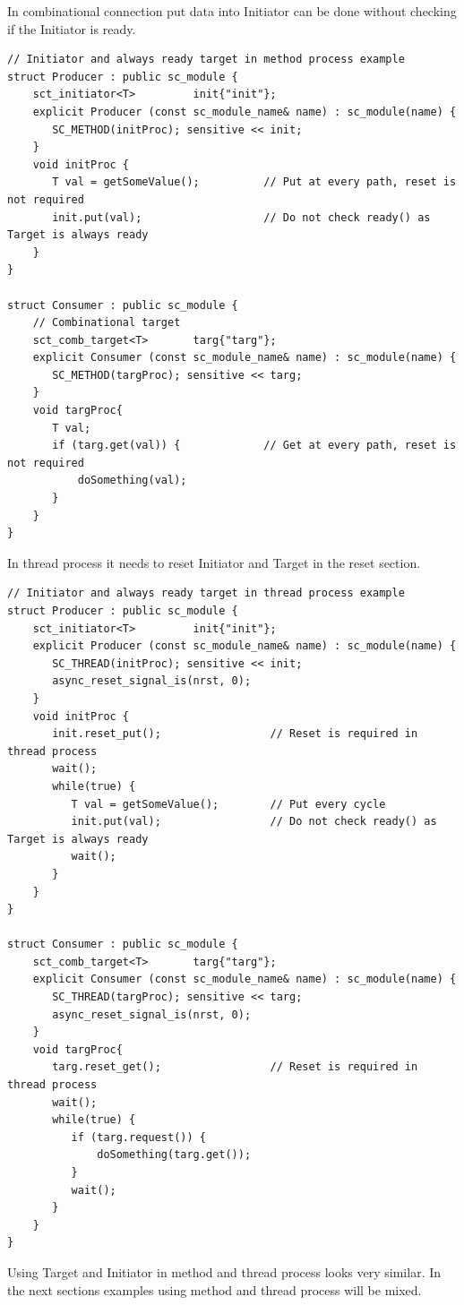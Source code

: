 In combinational connection put data into Initiator can be done without checking if the Initiator is ready.

\begin{lstlisting}[style=mycpp]
// Initiator and always ready target in method process example
struct Producer : public sc_module {
    sct_initiator<T>         init{"init"};
    explicit Producer (const sc_module_name& name) : sc_module(name) {
       SC_METHOD(initProc); sensitive << init;
    } 
    void initProc {
       T val = getSomeValue();          // Put at every path, reset is not required 
       init.put(val);                   // Do not check ready() as Target is always ready
    }						   
}

struct Consumer : public sc_module {
    // Combinational target
    sct_comb_target<T>       targ{"targ"};   
    explicit Consumer (const sc_module_name& name) : sc_module(name) {
       SC_METHOD(targProc); sensitive << targ;
    } 
    void targProc{
       T val;
       if (targ.get(val)) {             // Get at every path, reset is not required
           doSomething(val);        
       }
    }
}
\end{lstlisting}

In thread process it needs to reset Initiator and Target in the reset section.
\begin{lstlisting}[style=mycpp]
// Initiator and always ready target in thread process example
struct Producer : public sc_module {
    sct_initiator<T>         init{"init"};
    explicit Producer (const sc_module_name& name) : sc_module(name) {
       SC_THREAD(initProc); sensitive << init;
       async_reset_signal_is(nrst, 0);
    } 
    void initProc {
       init.reset_put();                 // Reset is required in thread process
       wait();
       while(true) {
          T val = getSomeValue();        // Put every cycle
          init.put(val);                 // Do not check ready() as Target is always ready
          wait();				   
       }
    }
}

struct Consumer : public sc_module {
    sct_comb_target<T>       targ{"targ"};   
    explicit Consumer (const sc_module_name& name) : sc_module(name) {
       SC_THREAD(targProc); sensitive << targ;
       async_reset_signal_is(nrst, 0);
    } 
    void targProc{
       targ.reset_get();                 // Reset is required in thread process
       wait();
       while(true) {
          if (targ.request()) {         
              doSomething(targ.get());
          }
          wait();
       }
    }
}
\end{lstlisting}
Using Target and Initiator in method and thread process looks very similar. In the next sections examples using method and thread process will be mixed.

